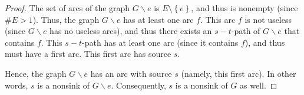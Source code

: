 \documentclass[12pt]{amsart}
\theoremstyle{definition}
\newcommand{\set}[1]{\left\{ #1 \right\}}
\begin{document}
\begin{proof}
The set of arcs of the graph $G \backslash e$ is
$E \setminus \set{e}$, and thus is nonempty
(since $\# E > 1$).
Thus, the graph $G \backslash e$ has at least one
arc $f$. This arc $f$ is not useless (since
$G \backslash e$ has no useless arcs), and thus
there exists an $s-t$-path of $G \backslash e$
that contains $f$. This $s-t$-path has at least
one arc (since it contains $f$), and thus must
have a first arc. This first arc has source $s$.

Hence, the graph $G \backslash e$ has an arc
with source $s$ (namely, this first arc).
In other words, $s$ is a nonsink of
$G \backslash e$. Consequently, $s$ is a nonsink
of $G$ as well.


\end{proof}
\end{document}
